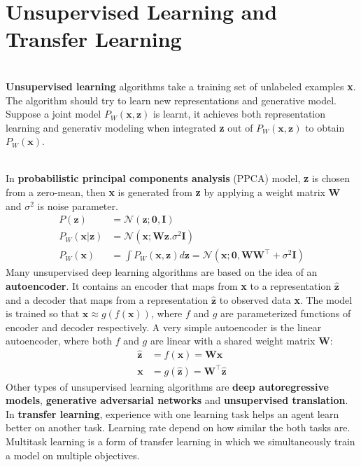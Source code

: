 \documentclass{article}
\begin{document}
\section{Unsupervised Learning and Transfer Learning}
\begin{paragraph}
\\
\textbf{Unsupervised learning} algorithms take a training set of unlabeled examples \textbf{x}. The algorithm should try to learn new representations and generative model. Suppose a joint model $P_W(\textbf{x}, \textbf{z})$ is learnt, it achieves both representation learning and generativ modeling when integrated \textbf{z} out of $P_W(\textbf{x},\textbf{z})$ to obtain $P_W(\textbf{x})$.
\end{paragraph}
\begin{paragraph}
\\
In \textbf{probabilistic principal components analysis} (PPCA) model, \textbf{z} is chosen from a zero-mean, then \textbf{x} is generated from \textbf{z} by applying a weight matrix \textbf{W} and $\sigma^2$ is noise parameter.
\begin{align*}
    P(\textbf{z}) & = \mathcal{N}(\textbf{z}; \textbf{0}, \textbf{I}) \\
    P_W(\textbf{x}|\textbf{z}) & = \mathcal{N}(\textbf{x}; \textbf{Wz}. \sigma^2\textbf{I}) \\
    P_W(\textbf{x}) & = \int P_W(\textbf{x},\textbf{z})d\textbf{z} = \mathcal{N}(\textbf{x}; \textbf{0}, \textbf{WW}^\top + \sigma^2\textbf{I})
\end{align*}
Many unsupervised deep learning algorithms are based on the idea of an \textbf{autoencoder}. It contains an encoder that maps from \textbf{x} to a representation $\hat{\textbf{z}}$ and a decoder that maps from a representation $\hat{\textbf{z}}$ to observed data \textbf{x}. The model is trained so that $\textbf{x} \approx g(f(\textbf{x}))$, where $f$ and $g$ are parameterized functions of encoder and decoder respectively. A very simple autoencoder is the linear autoencoder, where both $f$ and $g$ are linear with
a shared weight matrix \textbf{W}:
\begin{align*}
    \hat{\textbf{z}} & = f(\textbf{x}) = \textbf{Wx} \\
    \textbf{x} & = g(\hat{\textbf{z}}) = \textbf{W}^\top\hat{\textbf{z}}
\end{align*}
Other types of unsupervised learning algorithms are \textbf{deep autoregressive models}, \textbf{generative adversarial networks} and \textbf{unsupervised translation}. In \textbf{transfer learning}, experience with one learning task helps an agent learn better on another task. Learning rate depend on how similar the both tasks are. Multitask learning is a form of transfer learning in which we simultaneously train a model on multiple objectives.
\end{paragraph}
\end{document}
